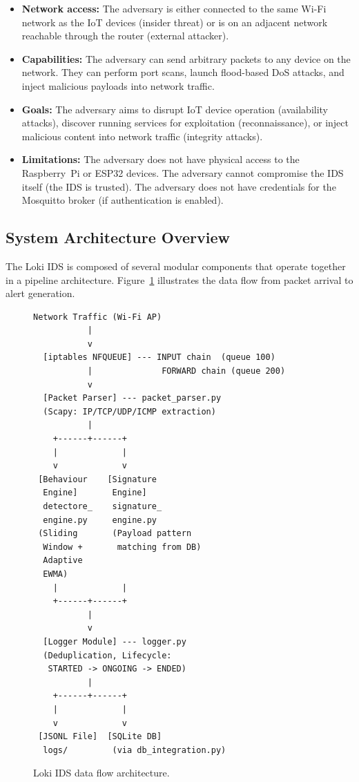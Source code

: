\documentclass[12pt,a4paper]{article}
\begin{document}
\begin{itemize}
    \item \textbf{Network access:} The adversary is either connected to the same Wi-Fi network as the IoT devices (insider threat) or is on an adjacent network reachable through the router (external attacker).
    \item \textbf{Capabilities:} The adversary can send arbitrary packets to any device on the network. They can perform port scans, launch flood-based DoS attacks, and inject malicious payloads into network traffic.
    \item \textbf{Goals:} The adversary aims to disrupt IoT device operation (availability attacks), discover running services for exploitation (reconnaissance), or inject malicious content into network traffic (integrity attacks).
    \item \textbf{Limitations:} The adversary does not have physical access to the Raspberry~Pi or ESP32 devices. The adversary cannot compromise the IDS itself (the IDS is trusted). The adversary does not have credentials for the Mosquitto broker (if authentication is enabled).
\end{itemize}

\subsection{System Architecture Overview}
\label{sec:arch_overview}

The Loki IDS is composed of several modular components that operate together in a pipeline architecture. Figure~\ref{fig:arch} illustrates the data flow from packet arrival to alert generation.

\begin{figure}[H]
\begin{lstlisting}[frame=none,backgroundcolor=\color{white},basicstyle=\ttfamily\footnotesize]
  Network Traffic (Wi-Fi AP)
           |
           v
  [iptables NFQUEUE] --- INPUT chain  (queue 100)
           |              FORWARD chain (queue 200)
           v
  [Packet Parser] --- packet_parser.py
  (Scapy: IP/TCP/UDP/ICMP extraction)
           |
    +------+------+
    |             |
    v             v
 [Behaviour    [Signature
  Engine]       Engine]
  detectore_    signature_
  engine.py     engine.py
 (Sliding       (Payload pattern
  Window +       matching from DB)
  Adaptive
  EWMA)
    |             |
    +------+------+
           |
           v
  [Logger Module] --- logger.py
  (Deduplication, Lifecycle:
   STARTED -> ONGOING -> ENDED)
           |
    +------+------+
    |             |
    v             v
 [JSONL File]  [SQLite DB]
  logs/         (via db_integration.py)
\end{lstlisting}
\caption{Loki IDS data flow architecture.}
\label{fig:arch}
\end{figure}
\end{document}
